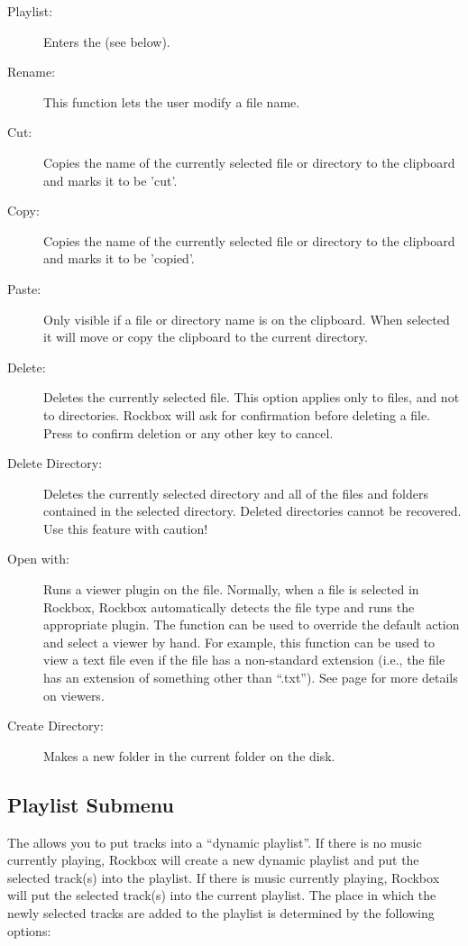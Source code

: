 \begin{description}
\item [Playlist:]
  Enters the  (see below).
\item [Rename:]
  This function lets the user modify a file name.
\item [Cut:]
  Copies the name of the currently selected file or directory to the clipboard
  and marks it to be 'cut'.
\item [Copy:]
  Copies the name of the currently selected file or directory to the clipboard
  and marks it to be 'copied'.
\item [Paste:]
  Only visible if a file or directory name is on the clipboard. When selected
  it will move or copy the clipboard to the current directory.
\item [Delete:]
  Deletes the currently selected file.  This option applies only to files, and
  not to directories.  Rockbox will ask for confirmation before deleting a file.
  Press
      {\ButtonSelect}
 to confirm deletion or any other key to cancel.
\item [Delete Directory:]
  Deletes the currently selected directory and all of the files and folders
  contained in the selected directory.  Deleted directories cannot be recovered.
  Use this feature with caution!
\item [Open with:] 
  Runs a viewer plugin on the file. Normally, when a file is selected in Rockbox,
  Rockbox automatically detects the file type and runs the appropriate plugin.
  The  function can be used to override the default action and
  select a viewer by hand.  For example, this function can be used to view a text file
  even if the file has a non-standard extension (i.e., the file has an extension
  of something other than ``.txt'').  See page \textmd{\pageref{ref:Viewersplugins}} 
  for more details on viewers.
\item [Create Directory:]
  Makes a new folder in the current folder on the disk.
\end{description}

\subsection{\label{ref:Playlistsubmenu}Playlist Submenu}
The  allows you to put tracks into a ``dynamic playlist''.
If there is no music currently playing, Rockbox will create a new dynamic playlist
and put the selected track(s) into the playlist.  If there is music currently playing,
Rockbox will put the selected track(s) into the current playlist.  The place in which
the newly selected tracks are added to the playlist is determined by the following
options:

